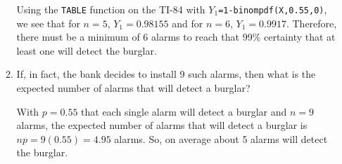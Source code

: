\documentclass{article}
\newcommand{\answer}[1]{\color{red}#1}
\begin{document}
\begin{enumerate}
\begin{enumerate}
{	Using the \texttt{TABLE} function on the TI-84 with \texttt{$Y_1$=1-binompdf(X,0.55,0)}, we see that for $n=5$, $Y_1 = 0.98155$ and for $n=6$, $Y_1 = 0.9917$.  Therefore, there must be a minimum of 6 alarms to reach that 99\% certainty that at least one will detect the burglar.
	} 
	
	\item If, in fact, the bank decides to install 9 such alarms, then what is the expected number of alarms that will detect a burglar? 
	
	{\answer With $p=0.55$ that each single alarm will detect a burglar and $n=9$ alarms, the expected number of alarms that will detect a burglar is $np=9(0.55) = 4.95$ alarms.  So, on average about 5 alarms will detect the burglar.
	} 
	\end{enumerate}

\vfill

\end{enumerate}
\end{document}
